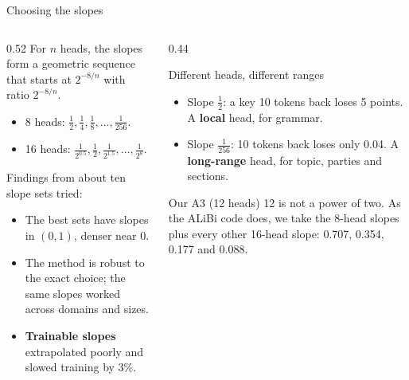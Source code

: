\documentclass[aspectratio=169,11pt]{beamer}
\begin{document}
\begin{frame}{Choosing the slopes}
  \begin{columns}[T]
    \begin{column}{0.52\textwidth}
      \small
      For $n$ heads, the slopes form a geometric sequence that starts at $2^{-8/n}$ with ratio $2^{-8/n}$.
      \begin{itemize}
        \item 8 heads: $\tfrac12,\tfrac14,\tfrac18,\ldots,\tfrac1{256}$.
        \item 16 heads: $\tfrac{1}{2^{0.5}},\tfrac12,\tfrac{1}{2^{1.5}},\ldots,\tfrac{1}{2^8}$.
      \end{itemize}
      \vspace{1mm}
      Findings from about ten slope sets tried:
      \begin{itemize}
        \item The best sets have slopes in $(0,1)$, denser near 0.
        \item The method is robust to the exact choice; the same slopes worked across domains and sizes.
        \item \textbf{Trainable slopes} extrapolated poorly and slowed training by 3\%.
      \end{itemize}
    \end{column}
    \begin{column}{0.44\textwidth}
      \begin{exampleblock}{Different heads, different ranges}
        \small
        \begin{itemize}
          \item Slope $\tfrac12$: a key 10 tokens back loses 5 points. A \textbf{local} head, for grammar.
          \item Slope $\tfrac{1}{256}$: 10 tokens back loses only 0.04. A \textbf{long-range} head, for topic, parties and sections.
        \end{itemize}
      \end{exampleblock}
      \begin{block}{Our A3 (12 heads)}
        \small
        12 is not a power of two. As the ALiBi code does, we take the 8-head slopes plus every other 16-head slope: 0.707, 0.354, 0.177 and 0.088.
      \end{block}
    \end{column}
  \end{columns}
\end{frame}
\end{document}
